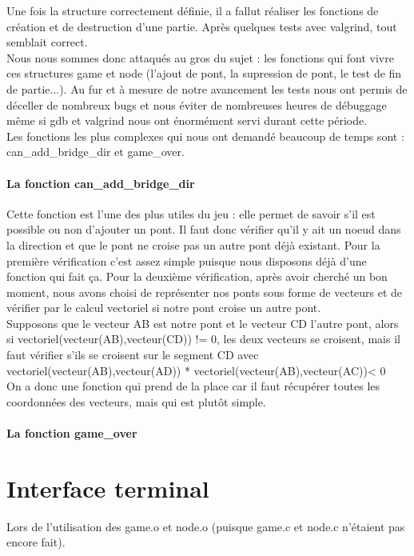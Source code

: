 \documentclass[12pt]{report}
\begin{document}
\textnormal{Une fois la structure correctement définie, il a fallut réaliser les fonctions de création et de destruction d'une partie. Après quelques tests avec valgrind, tout semblait correct.\\ Nous nous sommes donc attaqués au gros du sujet : les fonctions qui font vivre ces structures game et node (l'ajout de pont, la supression de pont, le test de fin de partie...). Au fur et à mesure de notre avancement les tests nous ont permis de déceller de nombreux bugs et nous éviter de nombreuses heures de débuggage même si gdb et valgrind nous ont énormément servi durant cette période.\\ Les fonctions les plus complexes qui nous ont demandé beaucoup de temps sont : can\_add\_bridge\_dir et game\_over.}

\subsubsection{La fonction can\_add\_bridge\_dir}
\textnormal{Cette fonction est l'une des plus utiles du jeu : elle permet de savoir s'il est possible ou non d'ajouter un pont. Il faut donc vérifier qu'il y ait un noeud dans la direction et que le pont ne croise pas un autre pont déjà existant. Pour la première vérification c'est assez simple puisque nous disposons déjà d'une fonction qui fait ça. Pour la deuxième vérification, après avoir cherché un bon moment, nous avons choisi de représenter nos ponts sous forme de vecteurs et de vérifier par le calcul vectoriel si notre pont croise un autre pont. \\ Supposons que le vecteur AB est notre pont et le vecteur CD l'autre pont, alors si vectoriel(vecteur(AB),vecteur(CD)) != 0, les deux vecteurs se croisent, mais il faut vérifier s'ils se croisent sur le segment CD avec vectoriel(vecteur(AB),vecteur(AD)) * vectoriel(vecteur(AB),vecteur(AC))< 0\\On a donc une fonction qui prend de la place car il faut récupérer toutes les coordonnées des vecteurs, mais qui est plutôt simple.}

\subsubsection{La fonction game\_over}

\chapter{Interface terminal}
Lors de l'utilisation des game.o et node.o (puisque game.c et node.c n'étaient pas encore fait).
\end{document}
